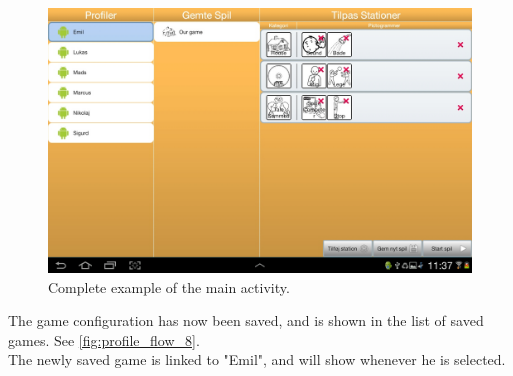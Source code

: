\begin{figure}[H]
\centering
\includegraphics[width=1.0\linewidth]{img/screenshots/profile_flow_8.jpg}%
\caption{Complete example of the main activity.}
\label{fig:profile_flow_8}
\end{figure}

The game configuration has now been saved, and is shown in the list of saved games. See \autoref{fig:profile_flow_8}.\\
The newly saved game is linked to "Emil", and will show whenever he is selected.
